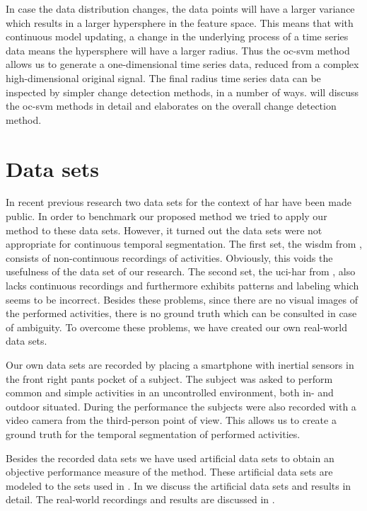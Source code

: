 In case the data distribution changes, the data points will have a larger variance which results in a larger hypersphere in the feature space.
This means that with continuous model updating, a change in the underlying process of a time series data means the hypersphere will have a larger radius.
Thus the \gls{oc-svm} method allows us to generate a one-dimensional time series data, reduced from a complex high-dimensional original signal.
The final radius time series data can be inspected by simpler change detection methods, in a number of ways.
 will discuss the \gls{oc-svm} methods in detail and  elaborates on the overall change detection method.

\section{Data sets}
In recent previous research two data sets for the context of \gls{har} have been made public.
In order to benchmark our proposed method we tried to apply our method to these data sets.
However, it turned out the data sets were not appropriate for continuous temporal segmentation.
The first set, the \gls{wisdm} from \cite{kwapisz2011activity}, consists of non-continuous recordings of activities.
Obviously, this voids the usefulness of the data set of our research.
The second set, the \gls{uci-har} from \cite{anguita2012human}, also lacks continuous recordings and furthermore exhibits patterns and labeling which seems to be incorrect.
Besides these problems, since there are no visual images of the performed activities, there is no ground truth which can be consulted in case of ambiguity.
To overcome these problems, we have created our own real-world data sets.

Our own data sets are recorded by placing a smartphone with inertial sensors in the front right pants pocket of a subject.
The subject was asked to perform common and simple activities in an uncontrolled environment, both in- and outdoor situated.
During the performance the subjects were also recorded with a video camera from the third-person point of view.
This allows us to create a ground truth for the temporal segmentation of performed activities.

Besides the recorded data sets we have used artificial data sets to obtain an objective performance measure of the method.
These artificial data sets are modeled to the sets used in \cite{camci2010change,takeuchi2006unifying}.
In  we discuss the artificial data sets and results in detail.
The real-world recordings and results are discussed in .

